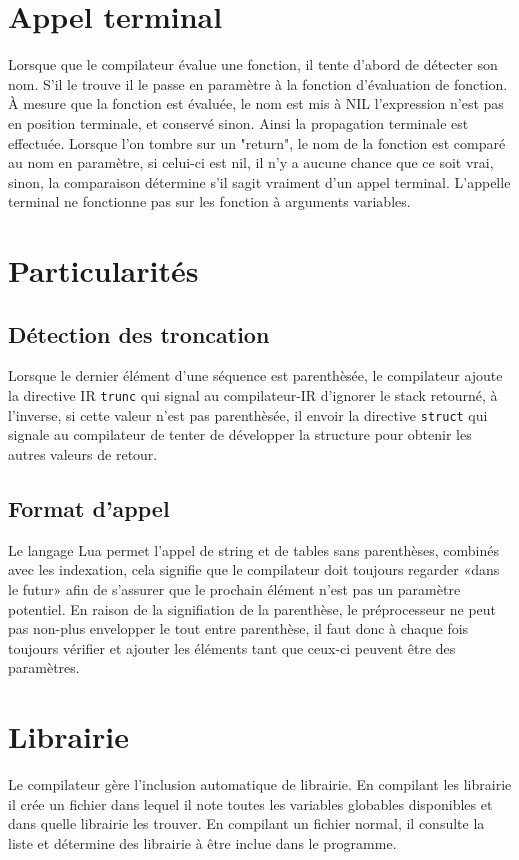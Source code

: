 \documentclass{article}
\begin{document}
\section{Appel terminal}
Lorsque que le compilateur évalue une fonction, il tente d'abord de détecter son nom. S'il le trouve il le passe en paramètre à la fonction d'évaluation de fonction. À mesure que la fonction est évaluée, le nom est mis à NIL l'expression n'est pas en position terminale, et conservé sinon. Ainsi la propagation terminale est effectuée. Lorsque l'on tombre sur un "return", le nom de la fonction est comparé au nom en paramètre, si celui-ci est nil, il n'y a aucune chance que ce soit vrai, sinon, la comparaison détermine s'il sagit vraiment d'un appel terminal. L'appelle terminal ne fonctionne pas sur les fonction à arguments variables.

\section{Particularités}
\subsection{Détection des troncation}
Lorsque le dernier élément d'une séquence est parenthèsée, le compilateur ajoute la directive IR \texttt{trunc} qui signal au compilateur-IR d'ignorer le stack retourné, à l'inverse, si cette valeur n'est pas parenthèsée, il envoir la directive \texttt{struct} qui signale au compilateur de tenter de développer la structure pour obtenir les autres valeurs de retour.

\subsection{Format d'appel}
Le langage Lua permet l'appel de string et de tables sans parenthèses, combinés avec les indexation, cela signifie que le compilateur doit toujours regarder «dans le futur» afin de s'assurer que le prochain élément n'est pas un paramètre potentiel. En raison de la signifiation de la parenthèse, le préprocesseur ne peut pas non-plus envelopper le tout entre parenthèse, il faut donc à chaque fois toujours vérifier et ajouter les éléments tant que ceux-ci peuvent être des paramètres.


\section{Librairie}
Le compilateur gère l'inclusion automatique de librairie. En compilant les librairie il crée un fichier dans lequel il note toutes les variables globables disponibles et dans quelle librairie les trouver. En compilant un fichier normal, il consulte la liste et détermine des librairie à être inclue dans le programme.
\end{document}
